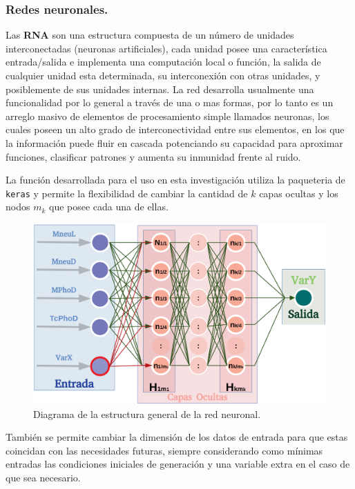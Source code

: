 \subsubsection{Redes neuronales.}
Las \textbf{RNA} son una estructura compuesta de un número de unidades interconectadas (neuronas artificiales), cada unidad posee una característica entrada/salida e implementa una computación local o función, la salida de cualquier unidad esta determinada, su interconexión con otras unidades, y posiblemente de sus unidades internas. La red desarrolla usualmente una funcionalidad por lo general a través de una o mas formas, por lo tanto es un arreglo masivo de elementos de procesamiento simple llamados neuronas, los cuales poseen un alto grado de interconectividad entre sus elementos, en los que la información puede fluir en cascada potenciando su capacidad para aproximar funciones, clasificar patrones y aumenta su inmunidad frente al ruido. 

La función desarrollada para el uso en esta investigación utiliza la paqueteria de \texttt{keras} y permite la flexibilidad de cambiar la cantidad de $k$ capas ocultas y los nodos $m_k$ que posee cada una de ellas.



\begin{figure}[h]
\centering
\includegraphics[width=.9\textwidth]{Simulacion/imagenes/neuronas.png}
\caption{Diagrama de la estructura general de la red neuronal.}
\label{neuronas}
\end{figure}

También se permite cambiar la dimensión de los datos de entrada para que estas coincidan con las necesidades futuras, siempre considerando como mínimas entradas las condiciones iniciales de generación y una variable extra en el caso de que sea necesario.

